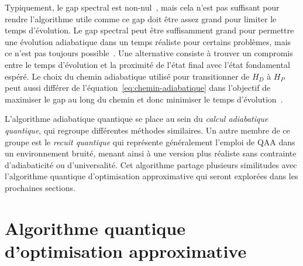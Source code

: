 Typiquement, le gap spectral est non-nul~\cite{farhiQuantumComputationAdiabatic2000}, mais cela n'est pas suffisant pour rendre l'algorithme utile comme ce gap doit être assez grand pour limiter le temps d'évolution. Le gap spectral peut être suffisamment grand pour permettre une évolution adiabatique dans un temps réaliste pour certains problèmes, mais ce n'est pas toujours possible~\cite{altshulerAndersonLocalizationMakes2010}. Une alternative consiste à trouver un compromis entre le temps d'évolution et la proximité de l'état final avec l'état fondamental espéré. Le choix du chemin adiabatique utilisé pour transitionner de $H_{D}$ à $H_{P}$ peut aussi différer de l'équation~\ref{eq:chemin-adiabatique} dans l'objectif de maximiser le gap au long du chemin et donc minimiser le temps d'évolution~\cite{nishimoriExponentialEnhancementEfficiency2017, hormoziNonstoquasticHamiltoniansQuantum2017}.

L'algorithme adiabatique quantique se place au sein du \textit{calcul adiabatique quantique}, qui regroupe différentes méthodes similaires. Un autre membre de ce groupe est le \textit{recuit quantique} qui représente généralement l'emploi de QAA dans un environnement bruité, menant ainsi à une version plus réaliste sans contrainte d'adiabaticité ou d'universalité. Cet algorithme partage plusieurs similitudes avec l'algorithme quantique d'optimisation approximative qui seront explorées dans les prochaines sections. 



\section{Algorithme quantique d'optimisation approximative}
\label{sec:algorithme-quantique-d'optimisation-approximative}

